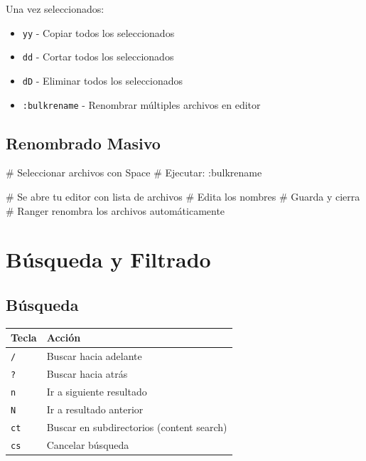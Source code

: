 \documentclass[
  doc,
  floatsintext,
  longtable,
  a4paper,
  nolmodern,
  notxfonts,
  notimes,
  12pt,
  colorlinks=true,linkcolor=blue,citecolor=blue,urlcolor=blue]{apa7}
\newenvironment{Shaded}{\begin{snugshade}}{\end{snugshade}}
\newcommand{\CommentTok}[1]{\textcolor[rgb]{0.37,0.37,0.37}{#1}}
\newcommand{\ExtensionTok}[1]{\textcolor[rgb]{0.00,0.23,0.31}{#1}}
\providecommand{\tightlist}{%
  \setlength{\itemsep}{0pt}\setlength{\parskip}{0pt}}
\newcounter{none} %
\begin{document}
Una vez seleccionados:

\begin{itemize}
\tightlist
\item
  \texttt{yy} - Copiar todos los seleccionados
\item
  \texttt{dd} - Cortar todos los seleccionados
\item
  \texttt{dD} - Eliminar todos los seleccionados
\item
  \texttt{:bulkrename} - Renombrar múltiples archivos en editor
\end{itemize}

\subsection{Renombrado Masivo}\label{renombrado-masivo}

\begin{Shaded}
\begin{Highlighting}[]
\CommentTok{\# Seleccionar archivos con Space}
\CommentTok{\# Ejecutar:}
\ExtensionTok{:bulkrename}

\CommentTok{\# Se abre tu editor con lista de archivos}
\CommentTok{\# Edita los nombres}
\CommentTok{\# Guarda y cierra}
\CommentTok{\# Ranger renombra los archivos automáticamente}
\end{Highlighting}
\end{Shaded}

\section{Búsqueda y Filtrado}\label{buxfasqueda-y-filtrado}

\subsection{Búsqueda}\label{buxfasqueda}

{\def\LTcaptype{none} %
\begin{longtable}[]{@{}ll@{}}
\toprule\noalign{}
Tecla & Acción \\
\midrule\noalign{}
\endhead
\bottomrule\noalign{}
\endlastfoot
\texttt{/} & Buscar hacia adelante \\
\texttt{?} & Buscar hacia atrás \\
\texttt{n} & Ir a siguiente resultado \\
\texttt{N} & Ir a resultado anterior \\
\texttt{ct} & Buscar en subdirectorios (content search) \\
\texttt{cs} & Cancelar búsqueda \\
\end{longtable}
}
\end{document}
